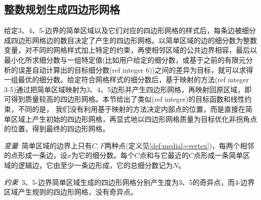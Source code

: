 \subsection{整数规划生成四边形网格}\label{sec:quad-meshing}
给定3、4、5-边界的简单区域以及它们对应的四边形网格的样式后，每条边被细分成四边形网格边的数目决定了产生的四边形网格。以简单区域的边的细分数为整数变量，对不同的网格样式加上特定的约束，再使相邻区域的公共边界相容，最后以最小化所求细分数与一组特定值(比如用户给定的细分数，或基于之前的有限元分析的误差自动计算出的目标细分数(ref integer 6))之间的差异为目标，就可以求得一组最优的细分数。给定符合网格样式的细分数后，基于映射的方法(ref integer 3-5)通过把简单区域映射为3、4、5边形并产生四边形网格，再映射回原区域，即可得到质量较高的四边形网格。本节给出了类似(ref integer)的目标函数和线性约束，不同的是，
我们没有利用基于映射的方法决定内部点的位置，而是直接在简单区域上产生初始的四边形网格，再显式地以四边形网格质量为目标优化非拐角点的位置，得到最终的四边形网格。

\emph{变量}\, 简单区域的边界上只有$C,F$两种点(定义见\ref{def:medial=vertex})，每两个相邻的点形成一条边，设$x$为它的细分数。每个$C$点和与它最近的$C$点形成一条简单区域的逻辑边，它由至少一条边形成，它的总细分数记为$N$。

\emph{约束}\, 3、5-边界简单区域生成的四边形网格分别产生度为3、5的奇异点，而4-边界区域产生规则的四边形网格，没有奇异点。

